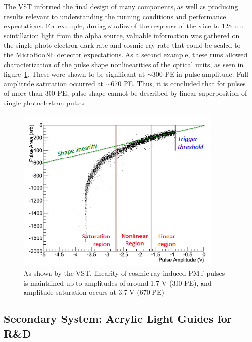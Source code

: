 The VST informed the final design of many components, as well as producing results relevant to understanding the running conditions and performance expectations.   For example, during studies of the response of the slice to 128 nm scintillation light from the alpha source, 
valuable information was gathered on the single photo-electron dark rate and cosmic ray rate that could be scaled to the MicroBooNE detector expectations.    As a second example, these runs allowed characterization of the pulse shape nonlinearities of the optical units, as seen in figure~\ref{fig:nonlinear}.  These were shown to be significant at $\sim$300 PE in pulse amplitude.  Full amplitude saturation occurred at $\sim$670 PE. Thus, it is concluded that for pulses of more than 300 PE, pulse shape cannot be described by linear superposition of single photoelectron pulses. 

\begin{figure}
\centering 
\includegraphics[width=0.9\textwidth]{./figures/nonlinear.png}
\caption{\footnotesize As shown by the VST, linearity of cosmic-ray induced PMT pulses is maintained up to amplitudes of around 1.7 V (300 PE), and amplitude saturation occurs at 3.7 V (670 PE) \cite{Jones:2015bya}
 \label{fig:nonlinear}  }
\end{figure}



\subsection{Secondary System: Acrylic Light Guides for R\&D}


